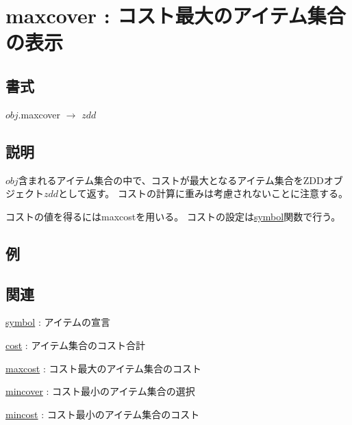
\section{maxcover : コスト最大のアイテム集合の表示\label{sect:maxcover}}
\subsection*{書式}
$obj$.maxcover $\rightarrow$ $zdd$

\subsection*{説明}
$obj$含まれるアイテム集合の中で、コストが最大となるアイテム集合をZDDオブジェクト$zdd$として返す。
コストの計算に重みは考慮されないことに注意する。

コストの値を得るにはmaxcostを用いる。
コストの設定は\hyperref[sect:symbol]{symbol}関数で行う。

\subsection*{例}


\subsection*{関連}
\hyperref[sect:symbol]{symbol} : アイテムの宣言

\hyperref[sect:cost]{cost} : アイテム集合のコスト合計

\hyperref[sect:maxcost]{maxcost} : コスト最大のアイテム集合のコスト

\hyperref[sect:mincover]{mincover} : コスト最小のアイテム集合の選択

\hyperref[sect:mincost]{mincost} : コスト最小のアイテム集合のコスト


